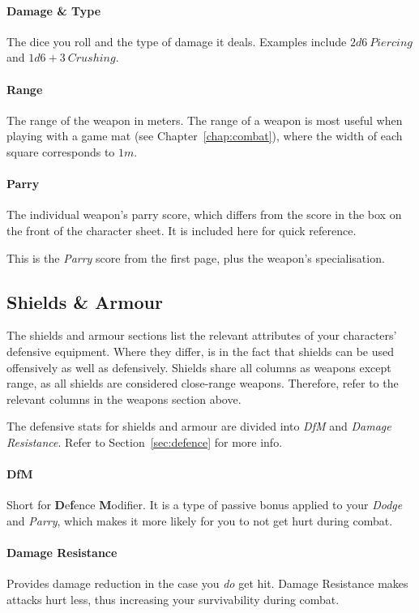 \paragraph{Damage \& Type} The dice you roll and the type of damage it deals.
Examples include $2d6\ \mathit{Piercing}$ and $1d6+3\ \mathit{Crushing}$.

\paragraph{Range} The range of the weapon in meters.
The range of a weapon is most useful when playing with a game mat (see Chapter~\ref{chap:combat}), where the width of each square corresponds to $1m$.

\paragraph{Parry} The individual weapon's parry score, which differs from the score in the box on the front of the character sheet.
It is included here for quick reference.

This is the \textit{Parry} score from the first page, plus the weapon's specialisation.

\subsection{Shields \& Armour}
The shields and armour sections list the relevant attributes of your characters' defensive equipment.
Where they differ, is in the fact that shields can be used offensively as well as defensively.
Shields share all columns as weapons except range, as all shields are considered close-range weapons.
Therefore, refer to the relevant columns in the weapons section above.

The defensive stats for shields and armour are divided into \textit{DfM} and \textit{Damage Resistance}.
Refer to Section~\ref{sec:defence} for more info.

\paragraph{DfM} Short for \textbf{D}e\textbf{f}ence \textbf{M}odifier.
It is a type of passive bonus applied to your \textit{Dodge} and \textit{Parry}, which makes it more likely for you to not get hurt during combat.

\paragraph{Damage Resistance} Provides damage reduction in the case you \textit{do} get hit.
Damage Resistance makes attacks hurt less, thus increasing your survivability during combat.

